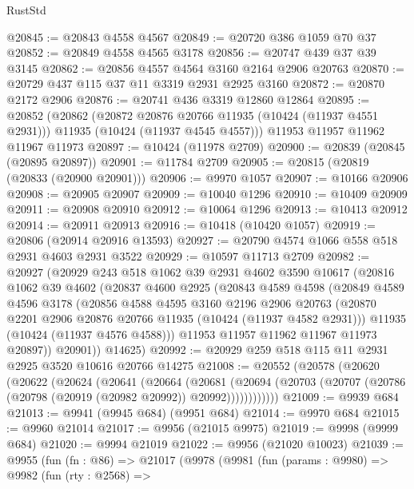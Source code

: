 \begin{lexlean}{RustStd}
\begin{coremodule}
@20845 := @20843 @4558 @4567
@20849 := @20720 @386 @1059 @70 @37
@20852 := @20849 @4558 @4565 @3178
@20856 := @20747 @439 @37 @39 @3145
@20862 := @20856 @4557 @4564 @3160 @2164 @2906 @20763
@20870 := @20729 @437 @115 @37 @11 @3319 @2931 @2925 @3160
@20872 := @20870 @2172 @2906
@20876 := @20741 @436 @3319 @12860 @12864
@20895 := @20852
    (@20862
      (@20872 @20876 @20766 @11935 (@10424 (@11937 @4551 @2931)))
      @11935
      (@10424 (@11937 @4545 @4557)))
    @11953
    @11957
    @11962
    @11967
    @11973
@20897 := @10424 (@11978 @2709)
@20900 := @20839 (@20845 (@20895 @20897))
@20901 := @11784 @2709
@20905 := @20815 (@20819 (@20833 (@20900 @20901)))
@20906 := @9970 @1057
@20907 := @10166 @20906
@20908 := @20905 @20907
@20909 := @10040 @1296
@20910 := @10409 @20909
@20911 := @20908 @20910
@20912 := @10064 @1296
@20913 := @10413 @20912
@20914 := @20911 @20913
@20916 := @10418 (@10420 @1057)
@20919 := @20806 (@20914 @20916 @13593)
@20927 := @20790 @4574 @1066 @558 @518 @2931 @4603 @2931 @3522
@20929 := @10597 @11713 @2709
@20982 := @20927
    (@20929
      @243
      @518
      @1062
      @39
      @2931
      @4602
      @3590
      @10617
      (@20816
        @1062
        @39
        @4602
        (@20837
          @4600
          @2925
          (@20843
            @4589
            @4598
            (@20849
              @4589
              @4596
              @3178
              (@20856
                @4588
                @4595
                @3160
                @2196
                @2906
                @20763
                (@20870 @2201 @2906 @20876 @20766 @11935 (@10424 (@11937 @4582 @2931)))
                @11935
                (@10424 (@11937 @4576 @4588)))
              @11953
              @11957
              @11962
              @11967
              @11973
              @20897))
          @20901))
      @14625)
@20992 := @20929 @259 @518 @115 @11 @2931 @2925 @3520 @10616 @20766 @14275
@21008 := @20552
    (@20578
      (@20620
        (@20622
          (@20624
            (@20641
              (@20664
                (@20681
                  (@20694
                    (@20703 (@20707 (@20786 (@20798 (@20919 (@20982 @20992)) @20992))))))))))))
@21009 := @9939 @684
@21013 := @9941 (@9945 @684) (@9951 @684)
@21014 := @9970 @684
@21015 := @9960 @21014
@21017 := @9956 (@21015 @9975)
@21019 := @9998 (@9999 @684)
@21020 := @9994 @21019
@21022 := @9956 (@21020 @10023)
@21039 := @9955
    (fun (fn : @86) =>
    @21017
      (@9978
        (@9981
          (fun (params : @9980) =>
          @9982
            (fun (rty : @2568) =>

\end{coremodule}
\end{lexlean}
